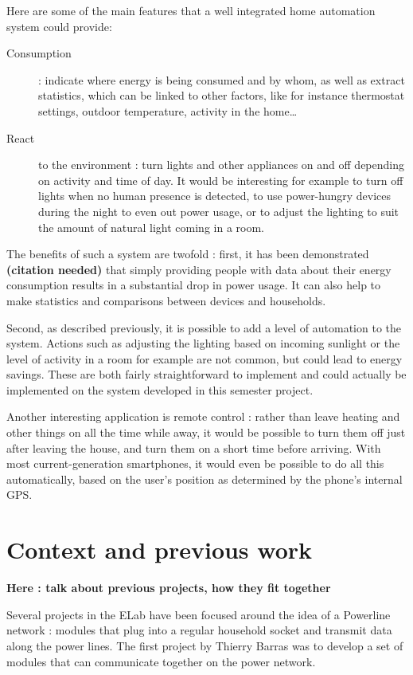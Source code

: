 Here are some of the main features that a well integrated home automation system
could provide:
\begin{description}
  \item[Consumption] : indicate where energy is being consumed and by whom, as
    well as extract statistics, which can be linked to other factors, like for
    instance thermostat settings, outdoor temperature, activity in the
    home\ldots
  \item[React] to the environment : turn lights and other appliances on and off
    depending on activity and time of day. It would be interesting for example
    to turn off lights when no human presence is detected, to use power-hungry
    devices during the night to even out power usage, or to adjust the lighting
    to suit the amount of natural light coming in a room. 
\end{description}

The benefits of such a system are twofold : first, it has been demonstrated
\textbf{(citation needed)} that simply providing people with data about their
energy consumption results in a substantial drop in power usage. It can also
help to make statistics and comparisons between devices and households.

Second, as described previously, it is possible to add a level of automation to
the system. Actions such as adjusting the lighting based on incoming sunlight or
the level of activity in a room for example are not common, but could lead to
energy savings. These are both fairly straightforward to implement and could
actually be implemented on the system developed in this semester project.

Another interesting application is remote control : rather than leave heating
and other things on all the time while away, it would be possible to turn them
off just after leaving the house, and turn them on a short time before arriving.
With most current-generation smartphones, it would even be possible to do all
this automatically, based on the user's position as determined by the phone's
internal GPS.


\section{Context and previous work}
\textbf{Here : talk about previous projects, how they fit together}


Several projects in the ELab have been focused around the idea of a Powerline
network : modules that plug into a regular household socket and transmit data
along the power lines. The first project by Thierry Barras \cite{barras2009} was
to develop a set of modules that can communicate together on the power network.

